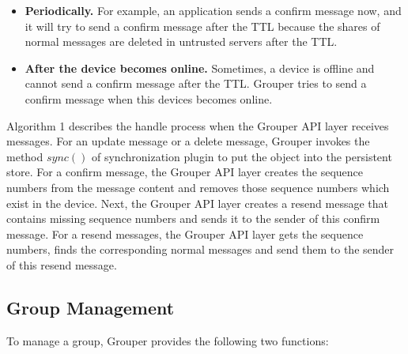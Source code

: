 \documentclass[twocolumn,10pt]{article}
\begin{document}
\begin{itemize}
	\setlength{\itemsep}{1pt}
	\setlength{\parskip}{0pt}
	\setlength{\parsep}{0pt}
	\item \textbf{Periodically.}
	For example, an application sends a confirm message now, and it will try to send a confirm message after the TTL because the shares of normal messages are deleted in untrusted servers after the TTL.
	\item \textbf{After the device becomes online.} 
	Sometimes, a device is offline and cannot send a confirm message after the TTL.
	Grouper tries to send a confirm message when this devices becomes online.
\end{itemize}

Algorithm 1 describes the handle process when the Grouper API layer receives messages.
For an update message or a delete message, Grouper invokes the method $sync()$ of synchronization plugin to put the object into the persistent store.
For a confirm message, the Grouper API layer creates the sequence numbers from the message content and removes those sequence numbers which exist in the device.
Next, the Grouper API layer creates a resend message that contains missing sequence numbers and sends it to the sender of this confirm message.
For a resend messages, the Grouper API layer gets the sequence numbers, finds the corresponding normal messages and send them to the sender of this resend message.

\subsection{Group Management}

To manage a group, Grouper provides the following two functions:
\end{document}
